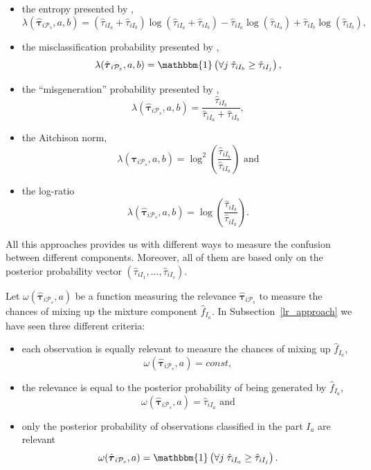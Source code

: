 \documentclass[10pt, a4paper]{article}
\newcommand{\m}[1]{\boldsymbol{#1}}
\begin{document}
\begin{spacing}{1.9}
\begin{itemize}
\item the entropy presented by \cite{baudry2010combining},
\[\lambda(\hat{\m \tau}_{i \mathcal{P}_s}, a, b) = (\hat{\tau}_{iI_a}+\hat{\tau}_{iI_b}) \log(\hat{\tau}_{iI_a} + \hat{\tau}_{iI_b}) - \hat{\tau}_{iI_a} \log(\hat{\tau}_{iI_a}) + \hat{\tau}_{iI_b} \log(\hat{\tau}_{iI_b}),\]
\item the misclassification probability presented by \cite{hennig2010methods}, \[\lambda(\hat{\m \tau}_{i \mathcal{P}_s}, a, b) = \mathbbm{1}\left( \forall j\; \hat{\tau}_{i I_{b}} \geq \hat{\tau}_{iI_j} \right),\]
\item the ``misgeneration'' probability presented by \cite{longford2014}, \[\lambda(\hat{\m \tau}_{i \mathcal{P}_s}, a, b) = \frac{\hat{\tau}_{iI_b}}{\hat{\tau}_{iI_a} + \hat{\tau}_{iI_b}},\]
\item the Aitchison norm, \[\lambda(\hat{\m \tau}_{i \mathcal{P}_s}, a, b) = \log^2 (\frac{ \hat{\tau}_{iI_b} }{ \hat{\tau}_{iI_a} }) \text{ and}\]
\item the log-ratio \[ \lambda(\hat{\m \tau}_{i \mathcal{P}_s}, a, b) = \log (\frac{ \hat{\tau}_{iI_b} }{ \hat{\tau}_{iI_a} }).\]
\end{itemize}

All this approaches provides us with different ways to measure the confusion between different components. Moreover, all of them are based only on the posterior probability
vector $(\hat{\tau}_{i I_{1}}, \dots, \hat{\tau}_{i I_{s}})$.

Let $\omega(\hat{\m \tau}_{i \mathcal{P}_s}, a)$ be a function measuring the relevance $\hat{\m \tau}_{i \mathcal{P}_s}$ to measure the chances of mixing up  the mixture component $\hat{f}_{I_a}$. In Subsection~\ref{lr_approach} we have seen three different criteria:

\begin{itemize}
\item each observation is equally relevant to measure the chances of mixing up  $\hat{f}_{I_a}$,
\[\omega(\hat{\m \tau}_{i \mathcal{P}_s}, a) = const,\]
\item the relevance is equal to the posterior probability of being generated by  $\hat{f}_{I_a}$,
\[\omega(\hat{\m \tau}_{i \mathcal{P}_s}, a) =  \hat{\tau}_{iI_a} \text{ and}\]
\item  only the posterior probability of observations classified in the part   $I_a$ are relevant
\[\omega(\hat{\m \tau}_{i \mathcal{P}_s}, a) = \mathbbm{1}\left( \forall j\; \hat{\tau}_{i I_{a}} \geq \hat{\tau}_{iI_j} \right).\]
\end{itemize}




\end{spacing}
\end{document}
